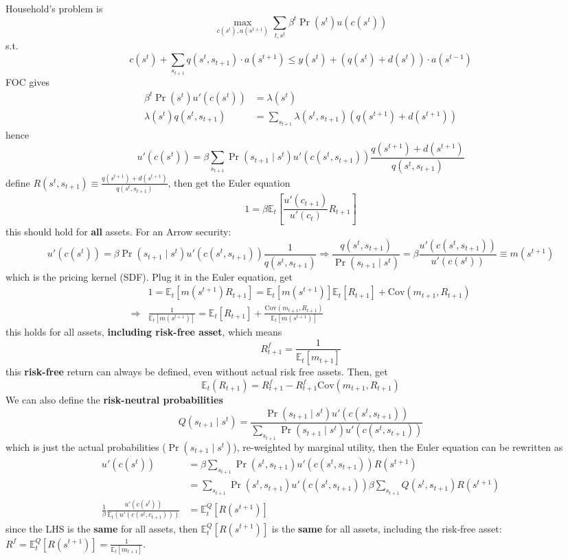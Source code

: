\documentclass[10pt,landscape,a4paper]{article}
\begin{document}
\begin{multicols*}{3}
Household's problem is
$$
\max_{c(s^t),a(s^{t+1})} \sum_{t,s^t}\beta^t \Pr(s^t)u(c(s^t))
$$
s.t.
$$
c(s^t)+ \sum_{s_{t+1}}q(s^t,s_{t+1})\cdot a(s^{t+1}) \leq y(s^t)+\left( q(s^t) + d(s^t) \right)\cdot a(s^{t-1})
$$
FOC gives
\begin{align*}
    \beta^t\Pr(s^t)u'(c(s^t))&=\lambda(s^t)\\
    \lambda(s^t)q(s^t,s_{t+1}) &= \sum_{s_{t+1}}\lambda(s^t,s_{t+1})(q(s^{t+1})+d(s^{t+1}))
\end{align*}
hence 
$$
u'(c(s^t)) = \beta \sum_{s_{t+1}}\Pr(s_{t+1}\mid s^t)u'(c(s^t,s_{t+1}))\frac{q(s^{t+1})+d(s^{t+1})}{q(s^t,s_{t+1})}
$$
define $R(s^t,s_{t+1})\equiv \frac{q(s^{t+1})+d(s^{t+1})}{q(s^t,s_{t+1})}$, then get the Euler equation
$$
1 = \beta \mathbb{E}_t\left[\frac{u'(c_{t+1})}{u'(c_t)} R_{t+1} \right]
$$
this should hold for \textbf{all} assets. For an Arrow security:
$$
u'(c(s^t)) = \beta \Pr(s_{t+1}\mid  s^t)u'(c(s^t,s_{t+1}))\frac{1}{q(s^t,s_{t+1})}\Rightarrow \frac{q(s^t,s_{t+1})}{\Pr(s_{t+1}\mid s^t)} = \beta \frac{u'(c(s^t,s_{t+1}))}{u'(c(s^t))} \equiv m(s^{t+1})
$$
which is the pricing kernel (SDF). Plug it in the Euler equation, get 
\begin{align*}
    &1 = \mathbb{E}_t\left[m(s^{t+1})R_{t+1}\right] = \mathbb{E}_t\left[m(s^{t+1})\right]\mathbb{E}_t\left[R_{t+1}\right] + \mathrm{Cov}(m_{t+1},R_{t+1}) \\
    \Rightarrow & \frac{1}{\mathbb{E}_t\left[m(s^{t+1})\right]} = \mathbb{E}_t\left[R_{t+1}\right] + \frac{\mathrm{Cov}(m_{t+1},R_{t+1})}{\mathbb{E}_t\left[m(s^{t+1})\right]}
\end{align*}
this holds for all assets, \textbf{including risk-free asset}, which means
$$
R^f_{t+1} = \frac{1}{\mathbb{E}_t\left[m_{t+1}\right]}
$$
this \textbf{risk-free} return can always be defined, even without actual risk free assets. Then, get
$$
\mathbb{E}_t(R_{t+1}) = R^f_{t+1} - R^f_{t+1}\mathrm{Cov}(m_{t+1},R_{t+1})
$$
We can also define the \textbf{risk-neutral probabilities}
$$
Q(s_{t+1}\mid s^t) = \frac{\Pr(s_{t+1}\mid s^t)u'\left(c(s^t,s_{t+1})\right)}{\sum_{s_{t+1}}\Pr(s_{t+1}\mid s^t)u'\left(c(s^t,s_{t+1})\right)}
$$
which is just the actual probabilities ($\Pr(s_{t+1}\mid s^t)$), re-weighted by marginal utility, then the Euler equation can be rewritten as
\begin{align*}
    u'(c(s^t)) &= \beta \sum_{s_{t+1}}\Pr(s^t,s_{t+1})u'(c(s^t,s_{t+1}))R(s^{t+1})\\
    &= \sum_{s_{t+1}}\Pr(s^t,s_{t+1})u'(c(s^t,s_{t+1})) \beta\sum_{s_{t+1}}Q(s^t,s_{t+1}) R(s^{t+1})\\
    \frac{1}{\beta}\frac{u'(c(s^t))}{\mathbb{E}_t\left(u'(c(s^t,c_{t+1}))\right)} &= \mathbb{E}^Q_t\left[R(s^{t+1})\right]
\end{align*}
since the LHS is the \textbf{same} for all assets, then $\mathbb{E}^Q_t\left[R(s^{t+1})\right]$ is the \textbf{\color{myred}same} for all assets, including the risk-free asset: $R^f = \mathbb{E}^Q_t \left[R(s^{t+1})\right] = \frac{1}{\mathbb{E}_t[m_{t+1}]}$.


\end{multicols*}
\end{document}

